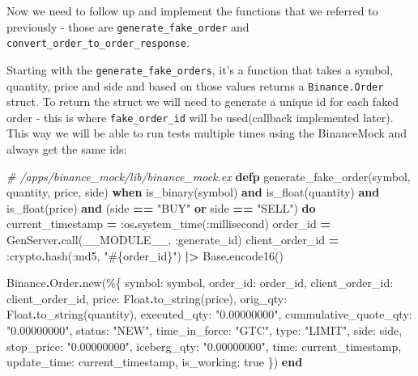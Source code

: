 \documentclass[
  oneside]{book}
\newenvironment{Shaded}{\begin{snugshade}}{\end{snugshade}}
\newcommand{\CommentTok}[1]{\textcolor[rgb]{0.56,0.35,0.01}{\textit{#1}}}
\newcommand{\ConstantTok}[1]{\textcolor[rgb]{0.00,0.00,0.00}{#1}}
\newcommand{\KeywordTok}[1]{\textcolor[rgb]{0.13,0.29,0.53}{\textbf{#1}}}
\newcommand{\NormalTok}[1]{#1}
\newcommand{\OperatorTok}[1]{\textcolor[rgb]{0.81,0.36,0.00}{\textbf{#1}}}
\newcommand{\OtherTok}[1]{\textcolor[rgb]{0.56,0.35,0.01}{#1}}
\newcommand{\StringTok}[1]{\textcolor[rgb]{0.31,0.60,0.02}{#1}}
\newcommand{\VariableTok}[1]{\textcolor[rgb]{0.00,0.00,0.00}{#1}}
\begin{document}
Now we need to follow up and implement the functions that we referred to
previously - those are \texttt{generate\_fake\_order} and \texttt{convert\_order\_to\_order\_response}.

Starting with the \texttt{generate\_fake\_orders}, it's a function that takes a symbol, quantity, price and side and based on those values returns a \texttt{Binance.Order} struct. To return the struct we will need to generate a unique id for each faked order - this is where \texttt{fake\_order\_id} will be used(callback implemented later). This way we will be able to run tests multiple times using the BinanceMock and always get the same ids:

\begin{Shaded}
\begin{Highlighting}[]
\CommentTok{\# /apps/binance\_mock/lib/binance\_mock.ex}
  \KeywordTok{defp}\NormalTok{ generate\_fake\_order(symbol, quantity, price, side)}
       \KeywordTok{when}\NormalTok{ is\_binary(symbol) }\KeywordTok{and}
\NormalTok{              is\_float(quantity) }\KeywordTok{and}
\NormalTok{              is\_float(price) }\KeywordTok{and}
\NormalTok{              (side }\OperatorTok{==} \StringTok{"BUY"} \KeywordTok{or}\NormalTok{ side }\OperatorTok{==} \StringTok{"SELL"}\NormalTok{) }\KeywordTok{do}
\NormalTok{    current\_timestamp }\OperatorTok{=} \VariableTok{:os}\OperatorTok{.}\NormalTok{system\_time(}\VariableTok{:millisecond}\NormalTok{)}
\NormalTok{    order\_id }\OperatorTok{=} \ConstantTok{GenServer}\OperatorTok{.}\NormalTok{call(}\ConstantTok{\_\_MODULE\_\_}\NormalTok{, }\VariableTok{:generate\_id}\NormalTok{)}
\NormalTok{    client\_order\_id }\OperatorTok{=} \VariableTok{:crypto}\OperatorTok{.}\NormalTok{hash(}\VariableTok{:md5}\NormalTok{, }\StringTok{"}\OtherTok{\#\{}\NormalTok{order\_id}\OtherTok{\}}\StringTok{"}\NormalTok{) }\OperatorTok{|\textgreater{}} \ConstantTok{Base}\OperatorTok{.}\NormalTok{encode16()}

    \ConstantTok{Binance}\OperatorTok{.}\ConstantTok{Order}\OperatorTok{.}\NormalTok{new(\%\{}
      \VariableTok{symbol:}\NormalTok{ symbol,}
      \VariableTok{order\_id:}\NormalTok{ order\_id,}
      \VariableTok{client\_order\_id:}\NormalTok{ client\_order\_id,}
      \VariableTok{price:} \ConstantTok{Float}\OperatorTok{.}\NormalTok{to\_string(price),}
      \VariableTok{orig\_qty:} \ConstantTok{Float}\OperatorTok{.}\NormalTok{to\_string(quantity),}
      \VariableTok{executed\_qty:} \StringTok{"0.00000000"}\NormalTok{,}
      \VariableTok{cummulative\_quote\_qty:} \StringTok{"0.00000000"}\NormalTok{,}
      \VariableTok{status:} \StringTok{"NEW"}\NormalTok{,}
      \VariableTok{time\_in\_force:} \StringTok{"GTC"}\NormalTok{,}
      \VariableTok{type:} \StringTok{"LIMIT"}\NormalTok{,}
      \VariableTok{side:}\NormalTok{ side,}
      \VariableTok{stop\_price:} \StringTok{"0.00000000"}\NormalTok{,}
      \VariableTok{iceberg\_qty:} \StringTok{"0.00000000"}\NormalTok{,}
      \VariableTok{time:}\NormalTok{ current\_timestamp,}
      \VariableTok{update\_time:}\NormalTok{ current\_timestamp,}
      \VariableTok{is\_working:} \ConstantTok{true}
\NormalTok{    \})}
  \KeywordTok{end}
\end{Highlighting}
\end{Shaded}
\end{document}
